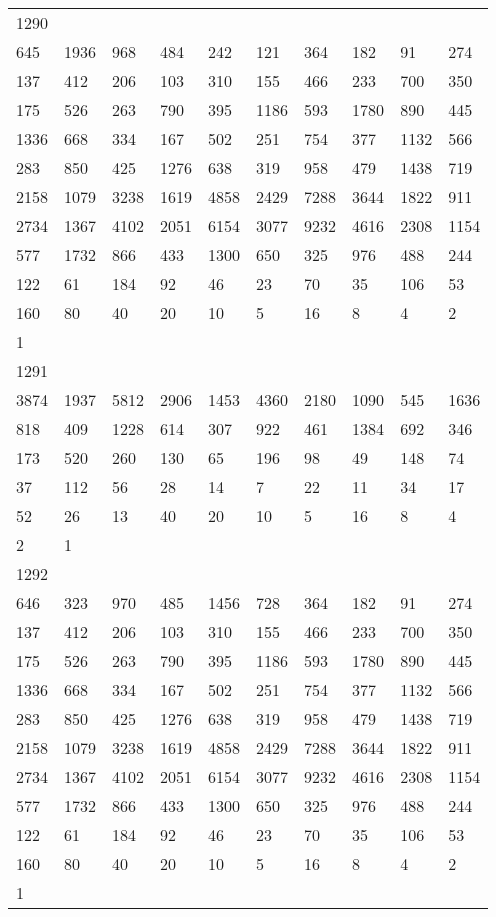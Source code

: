 \begin{longtable}{*{10}{l}}
1290&&&&&&&&&\\
645& 1936& 968& 484& 242& 121& 364& 182& 91& 274\\
137& 412& 206& 103& 310& 155& 466& 233& 700& 350\\
175& 526& 263& 790& 395& 1186& 593& 1780& 890& 445\\
1336& 668& 334& 167& 502& 251& 754& 377& 1132& 566\\
283& 850& 425& 1276& 638& 319& 958& 479& 1438& 719\\
2158& 1079& 3238& 1619& 4858& 2429& 7288& 3644& 1822& 911\\
2734& 1367& 4102& 2051& 6154& 3077& 9232& 4616& 2308& 1154\\
577& 1732& 866& 433& 1300& 650& 325& 976& 488& 244\\
122& 61& 184& 92& 46& 23& 70& 35& 106& 53\\
160& 80& 40& 20& 10& 5& 16& 8& 4& 2\\
1& \\

1291&&&&&&&&&\\
3874& 1937& 5812& 2906& 1453& 4360& 2180& 1090& 545& 1636\\
818& 409& 1228& 614& 307& 922& 461& 1384& 692& 346\\
173& 520& 260& 130& 65& 196& 98& 49& 148& 74\\
37& 112& 56& 28& 14& 7& 22& 11& 34& 17\\
52& 26& 13& 40& 20& 10& 5& 16& 8& 4\\
2& 1& \\

1292&&&&&&&&&\\
646& 323& 970& 485& 1456& 728& 364& 182& 91& 274\\
137& 412& 206& 103& 310& 155& 466& 233& 700& 350\\
175& 526& 263& 790& 395& 1186& 593& 1780& 890& 445\\
1336& 668& 334& 167& 502& 251& 754& 377& 1132& 566\\
283& 850& 425& 1276& 638& 319& 958& 479& 1438& 719\\
2158& 1079& 3238& 1619& 4858& 2429& 7288& 3644& 1822& 911\\
2734& 1367& 4102& 2051& 6154& 3077& 9232& 4616& 2308& 1154\\
577& 1732& 866& 433& 1300& 650& 325& 976& 488& 244\\
122& 61& 184& 92& 46& 23& 70& 35& 106& 53\\
160& 80& 40& 20& 10& 5& 16& 8& 4& 2\\
1& \\


\end{longtable}

